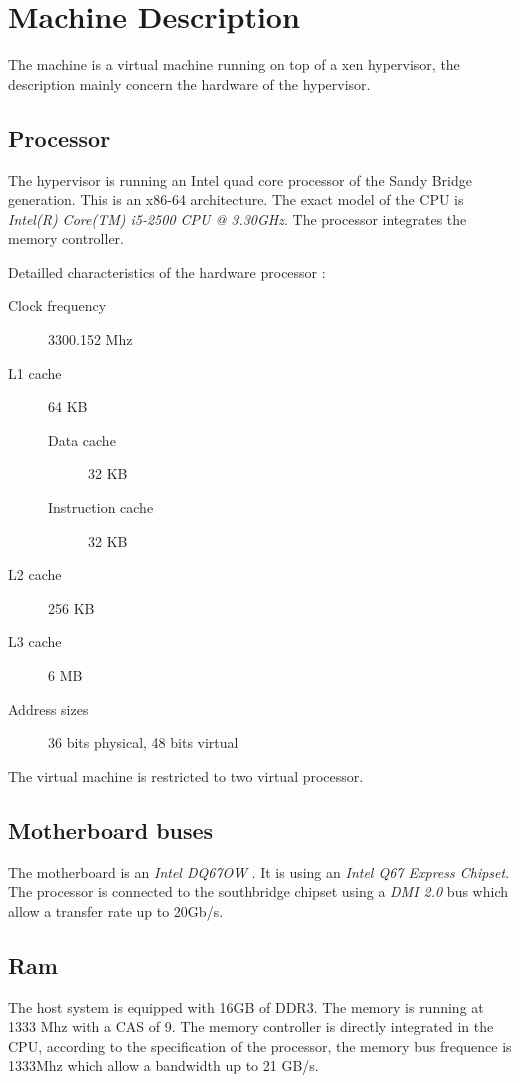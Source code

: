 \section{Machine Description}
The machine is a virtual machine running on top of a xen hypervisor, the
description mainly concern the hardware of the hypervisor.

\subsection{Processor}
The hypervisor is running an Intel quad core processor of the Sandy Bridge generation.
This is an x86-64 architecture.
The exact model of the CPU is \emph{Intel(R) Core(TM) i5-2500 CPU @ 3.30GHz}. \cite{intel-i5-2500}
The processor integrates the memory controller.

Detailled characteristics of the hardware processor :
\begin{description}
\item[Clock frequency] 3300.152 Mhz
\item[L1 cache] 64 KB
\begin{description}
\item[Data cache] 32 KB
\item[Instruction cache] 32 KB
\end{description}
\item[L2 cache] 256 KB
\item[L3 cache] 6 MB
\item[Address sizes] 36 bits physical, 48 bits virtual
\end{description}
The virtual machine is restricted to two virtual processor.

\subsection{Motherboard buses}
The motherboard is an \emph{Intel DQ67OW} \cite{dq670w-motherboard}. It is using an \emph{Intel Q67
Express Chipset}. \cite{q67-chipset}
The processor is connected to the southbridge chipset using a \emph{DMI 2.0} bus which
allow a transfer rate up to 20Gb/s.

\subsection{Ram}
The host system is equipped with 16GB of DDR3.
The memory is running at 1333 Mhz with a CAS of 9.
The memory controller is directly integrated in the CPU, according to the
specification of the processor, the memory bus frequence is 1333Mhz which allow a bandwidth up
to 21 GB/s. \cite{intel-i5-2500}


